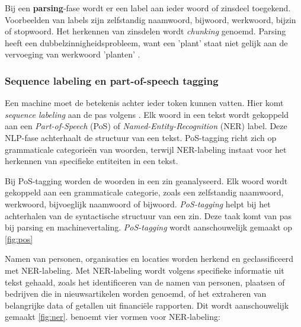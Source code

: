 Bij een \textbf{parsing}-fase wordt er een label aan ieder woord of zinsdeel toegekend. Voorbeelden van labels zijn zelfstandig naamwoord, bijwoord, werkwoord, bijzin of stopwoord. Het herkennen van zinsdelen wordt \textit{chunking} genoemd. Parsing heeft een dubbelzinnigheidsprobleem, want een 'plant' staat niet gelijk aan de vervoeging van werkwoord 'planten' \autocite{Eisenstein2019}.


\subsubsection{Sequence labeling en part-of-speech tagging}

Een machine moet de betekenis achter ieder token kunnen vatten. Hier komt \textit{sequence labeling} aan de pas volgens \textcite{Eisenstein2019}. Elk woord in een tekst wordt gekoppeld aan een \textit{Part-of-Speech} (PoS) of \textit{Named-Entity-Recognition} (NER) label. Deze NLP-fase achterhaalt de structuur van een tekst. PoS-tagging richt zich op grammaticale categorieën van woorden, terwijl NER-labeling instaat voor het herkennen van specifieke entiteiten in een tekst. 

Bij PoS-tagging worden de woorden in een zin geanalyseerd. Elk woord wordt gekoppeld aan een grammaticale categorie, zoals een zelfstandig naamwoord, werkwoord, bijvoeglijk naamwoord of bijwoord. \textit{PoS-tagging} helpt bij het achterhalen van de syntactische structuur van een zin. Deze taak komt van pas bij parsing en machinevertaling. \textit{PoS-tagging} wordt aanschouwelijk gemaakt op \ref{fig:pos}

Namen van personen, organisaties en locaties worden herkend en geclassificeerd met NER-labeling. Met NER-labeling wordt volgens \textcite{Jurafsky2014} specifieke informatie uit tekst gehaald, zoals het identificeren van de namen van personen, plaatsen of bedrijven die in nieuwsartikelen worden genoemd, of het extraheren van belangrijke data of getallen uit financiële rapporten. Dit wordt aanschouwelijk gemaakt \ref{fig:ner}. \textcite{Li2018} benoemt vier vormen voor NER-labeling:

